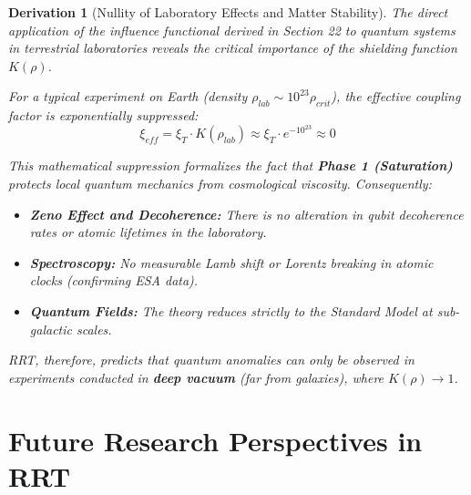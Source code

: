 \documentclass[10pt, a4paper]{article}
\newtheorem{derivation}{Derivation}
\begin{document}
\begin{derivation}[Nullity of Laboratory Effects and Matter Stability]
The direct application of the influence functional derived in Section 22 to quantum systems in terrestrial laboratories reveals the critical importance of the shielding function $K(\rho)$.

For a typical experiment on Earth (density $\rho_{lab} \sim 10^{23} \rho_{crit}$), the effective coupling factor is exponentially suppressed:
\begin{equation}
\xi_{eff} = \xi_T \cdot K(\rho_{lab}) \approx \xi_T \cdot e^{-10^{23}} \approx 0
\end{equation}

This mathematical suppression formalizes the fact that \textbf{Phase 1 (Saturation)} protects local quantum mechanics from cosmological viscosity. Consequently:
\begin{itemize}
    \item \textbf{Zeno Effect and Decoherence:} There is no alteration in qubit decoherence rates or atomic lifetimes in the laboratory.
    \item \textbf{Spectroscopy:} No measurable Lamb shift or Lorentz breaking in atomic clocks (confirming ESA data).
    \item \textbf{Quantum Fields:} The theory reduces strictly to the Standard Model at sub-galactic scales.
\end{itemize}

RRT, therefore, predicts that quantum anomalies can only be observed in experiments conducted in \textbf{deep vacuum} (far from galaxies), where $K(\rho) \to 1$.
\end{derivation}

\section{Future Research Perspectives in RRT}
\end{document}
